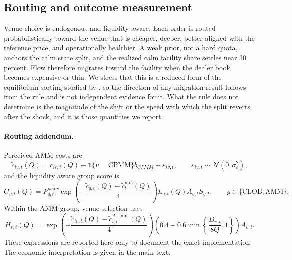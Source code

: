 \documentclass[a4paper,fleqn]{cas-sc}
\begin{document}
\subsection{Routing and outcome measurement}

Venue choice is endogenous and liquidity aware. Each order is routed probabilistically toward the venue that is cheaper, deeper, better aligned with the reference price, and operationally healthier. A weak prior, not a hard quota, anchors the calm state split, and the realized calm facility share settles near 30 percent. Flow therefore migrates toward the facility when the dealer book becomes expensive or thin. We stress that this is a reduced form of the equilibrium sorting studied by \citet{coexisting}, so the direction of any migration result follows from the rule and is not independent evidence for it. What the rule does not determine is the magnitude of the shift or the speed with which the split reverts after the shock, and it is those quantities we report.

\paragraph{Routing addendum.}
Perceived AMM costs are
\begin{equation}
\widetilde c_{iv,t}(Q)=c_{iv,t}(Q)-\mathbf{1}\{v=\mathrm{CPMM}\}b_{CPMM}+\varepsilon_{iv,t},
\qquad
\varepsilon_{iv,t}\sim \mathcal{N}(0,\sigma_\varepsilon^2),
\end{equation}
and the liquidity aware group score is
\begin{equation}
G_{g,t}(Q)=P^{prior}_{g,t}\exp\left(-\frac{\widetilde c_{g,t}(Q)-\widetilde c^{\min}_{t}(Q)}{4}\right)L_{g,t}(Q)A_{g,t}S_{g,t},
\qquad g\in\{\mathrm{CLOB},\mathrm{AMM}\}.
\end{equation}
Within the AMM group, venue selection uses
\begin{equation}
H_{v,t}(Q)=\exp\left(-\frac{\widetilde c_{iv,t}(Q)-\widetilde c^{A,\min}_{i,t}(Q)}{4}\right)\left(0.4+0.6\min\left\{\frac{D_{v,t}}{8Q},1\right\}\right)A_{v,t}.
\end{equation}
These expressions are reported here only to document the exact implementation. The economic interpretation is given in the main text.
\end{document}
